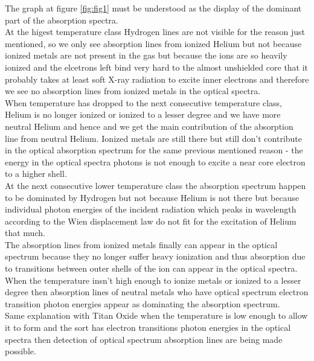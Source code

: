 \documentclass[./exercises.tex]{subfiles}
\begin{document}
\begin{enumerate}
The graph at figure \ref{fig:fig1} must be understood as the display of the dominant part of the absorption
spectra.\\

At the higest temperature class Hydrogen lines are not visible for the reason just mentioned,
so we only see absorption lines from ionized Helium but not because ionized metals are not present in the gas
but because the ions are so heavily ionized and the elcetrons left bind very hard to the almost unshielded core 
that it probably takes at least soft X-ray radiation to excite inner electrons and therefore
we see no absorption lines from ionized metals in the optical spectra.\\

When temperature has dropped to the next consecutive temperature class,
Helium is no longer ionized or ionized to a lesser degree and we have more neutral Helium
and hence and we get the main contribution of the absorption line from neutral Helium.
Ionized metals are still there but still don't
contribute in the optical absorption spectrum for the same previous mentioned reason - the energy
in the optical spectra photons is not enough to excite a near core electron to a higher shell.\\

At the next consecutive lower temperature class
the absorption spectrum happen to be dominated by Hydrogen but not because Helium is not there but because
individual photon energies of the incident radiation which peaks in wavelength according to the Wien displacement law
do not fit for the excitation of Helium that much.\\

The absorption lines from ionized metals finally can appear in the optical spectrum
because they no longer suffer heavy ionization and thus absorption due to
transitions between outer shells of the ion can appear in the optical spectra.\\

When the temperature insn't high enough to ionize metals or ionized to a lesser degree then
absorption lines of neutral metals who have optical spectrum electron transition photon energies appear as dominating the absorption spectrum.\\

Same explanation with Titan Oxide when the temperature is low enough to allow it to form
and the sort has electron transitions photon energies in the optical spectra then detection of 
optical spectrum absorption lines are being made possible.\\


\end{enumerate}
\end{document}
